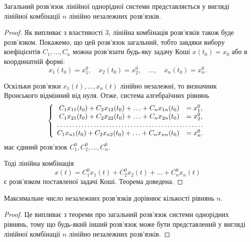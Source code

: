 \begin{theorem}
	Загальний розв'язок лінійної однорідної системи представляється у вигляді лінійної комбінації $n$ лінійно незалежних роз\-в'яз\-ків.
\end{theorem}

\begin{proof}
	Як випливає з властивості 3, лінійна комбінація розв'язків також буде розв'язком. Покажемо, що цей розв'язок загальний, тобто завдяки вибору коефіцієнтів $C_1, \ldots, C_n$ можна розв'язати будь-яку задачу Коші $x(t_0) = x_0$ або в координатній формі:
	\begin{equation*}
		x_1(t_0) = x_1^0, \quad x_2(t_0) = x_2^0, \quad \ldots, \quad x_n(t_0) = x_n^0.
	\end{equation*}

	Оскільки розв'язки $x_1(t), \ldots, x_n(t)$  лінійно незалежні, то визначник Вронського відмінний від нуля. Отже, система алгебраїчних рівнянь
	\begin{equation*}
		\left\{
			\begin{array}{rl}
				C_1 x_{11}(t_0) + C_2 x_{12}(t_0) + \ldots + C_n x_{1n}(t_0) &= x_1^0, \\
				C_1 x_{21}(t_0) + C_2 x_{22}(t_0) + \ldots + C_n x_{2n}(t_0) &= x_2^0, \\
				\hdotsfor{2} \\
				C_1 x_{n1}(t_0) + C_2 x_{n2}(t_0) + \ldots + C_n x_{nn}(t_0) &= x_n^0.
			\end{array}
		\right.
	\end{equation*}
	має єдиний розв'язок $C_1^0, C_2^0, \ldots, C_n^0$. \parvskip

	Тоді лінійна комбінація
	\begin{equation*}
		x(t) = C_1^0 x_1(t) + C_2^0 x_2(t) + \ldots + C_n^0 x_n(t)
	\end{equation*}
	є розв'язком поставленої задачі Коші. Теорема доведена.
\end{proof}

\begin{remark}
	Максимальне число незалежних розв'язків дорівнює кількості рівнянь $n$.
\end{remark}

\begin{proof}
	Це випливає з теореми про загальний розв'язок системи однорідних рівнянь, тому що будь-який інший розв'язок може бути представлений у вигляді лінійної комбінації $n$ лінійно незалежних розв'язків.
\end{proof}

